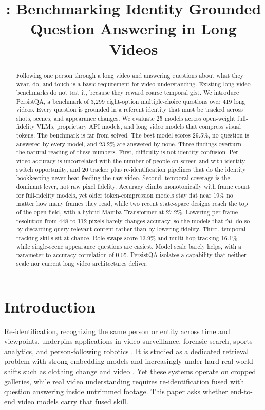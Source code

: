 \documentclass{article}
\title{\bench: Benchmarking Identity Grounded \\ Question Answering in Long Videos}
\author{}
\newcommand{\bench}{PersistQA}
\newcommand{\numq}{3{,}299}
\newcommand{\numv}{419}
\newcommand{\nummodels}{25}
\begin{document}
\maketitle

\begin{abstract}
Following one person through a long video and answering questions about what they wear, do, and touch is a basic requirement for video understanding. Existing long video benchmarks do not test it, because they reward coarse temporal gist. We introduce \bench, a benchmark of \numq{} eight-option multiple-choice questions over \numv{} long videos. Every question is grounded in a referent identity that must be tracked across shots, scenes, and appearance changes. We evaluate \nummodels{} models across open-weight full-fidelity VLMs, proprietary API models, and long video models that compress visual tokens. The benchmark is far from solved. The best model scores 29.5\%, no question is answered by every model, and 23.2\% are answered by none. Three findings overturn the natural reading of these numbers. First, difficulty is not identity confusion. Per-video accuracy is uncorrelated with the number of people on screen and with identity-switch opportunity, and 20 tracker plus re-identification pipelines that do the identity bookkeeping never beat feeding the raw video. Second, temporal coverage is the dominant lever, not raw pixel fidelity. Accuracy climbs monotonically with frame count for full-fidelity models, yet older token-compression models stay flat near 19\% no matter how many frames they read, while two recent state-space designs reach the top of the open field, with a hybrid Mamba-Transformer at 27.2\%. Lowering per-frame resolution from 448 to 112 pixels barely changes accuracy, so the models that fail do so by discarding query-relevant content rather than by lowering fidelity. Third, temporal tracking skills sit at chance. Role swaps score 13.9\% and multi-hop tracking 16.1\%, while single-scene appearance questions are easiest. Model scale barely helps, with a parameter-to-accuracy correlation of 0.05. \bench{} isolates a capability that neither scale nor current long video architectures deliver.
\end{abstract}


\section{Introduction}
Re-identification, recognizing the same person or entity across time and viewpoints, underpins applications in video surveillance, forensic search, sports analytics, and person-following robotics \citep{reidsurvey,market1501,mevid}. It is studied as a dedicated retrieval problem with strong embedding models \citep{osnet,transreid,clipreid,solider} and increasingly under hard real-world shifts such as clothing change \citep{differ,prcc,ltcc,vcclothes} and video \citep{mars,tfclip,keyreid}. Yet these systems operate on cropped galleries, while real video understanding requires re-identification fused with question answering inside untrimmed footage. This paper asks whether end-to-end video models carry that fused skill.
\end{document}
